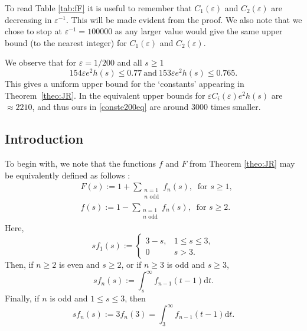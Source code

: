 \documentclass[12pt]{amsart}
\begin{document}
To read Table \ref{tab:fF} it is useful to remember that $C_1(\varepsilon)$ and $C_2(\varepsilon)$ are decreasing in $\varepsilon^{-1}$. This will be made evident from the proof.
We also note that we chose to stop at $\varepsilon^{-1}=100000$ as any larger value would give the same upper bound (to the nearest integer) for $C_1(\varepsilon)$ and $C_2(\varepsilon)$.

We observe that for $\varepsilon=1/200$ and all $s\ge 1$
\begin{equation}\label{conste200eq}
    154\varepsilon e^2h(s)  \le 0.77 ~\text{and} ~153\varepsilon  e^2h(s)\le 0.765.
\end{equation}
This gives a uniform upper bound for the `constants' appearing in Theorem~\ref{theo:JR}. In \cite{Nathanson} the equivalent upper bounds for $\varepsilon C_i(\varepsilon) e^2 h(s)$ are $\approx 2210$, and thus ours in \eqref{conste200eq} are around $3000$ times smaller. 
\subsection{Introduction}\label{introsub}
To begin with, we note that the functions $f$ and $F$ from Theorem \ref{theo:JR} may be equivalently defined as follows \cite[Theorem 9.4]{Nathanson}:
\begin{align}
    &F(s):= 1 + \sum_{\substack{n = 1 \\ n \text{ odd}}} f_n(s), ~\text{ for } s \ge 1, \label{bigFdeffn}\\
    &f(s):= 1 - \sum_{\substack{n = 1 \\ n \text{ odd}}} f_n(s), ~\text{ for } s \ge 2. \label{lilFdeffn}
\end{align}
Here,
\begin{equation}
\label{eq:f11}
    sf_1(s):=\begin{cases} 
      3-s,& 1\le s \le 3, \\
      0 & s>3.
      \end{cases} 
\end{equation} 
Then, if $n\ge 2$ is even and $s\ge 2$, or if $n\ge 3$ is odd and $s\ge 3$,
\begin{equation}
\label{eq:f22}
sf_n(s):=\int_s^{\infty}f_{n-1}(t-1)\mathrm{d}t.
\end{equation}
Finally, if $n$ is odd and $1\le s \le 3$, then
\begin{equation}
\label{eq:odd}
    sf_n(s):=3f_n(3)=\int_3^{\infty}f_{n-1}(t-1)\mathrm{d}t.
\end{equation}
\end{document}
